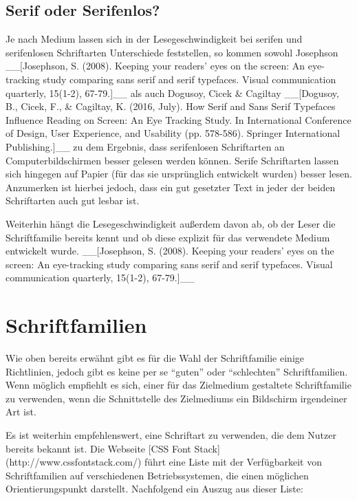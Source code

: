 \subsection{Serif oder Serifenlos?}
Je nach Medium lassen sich in der Lesegeschwindigkeit bei serifen und serifenlosen Schriftarten Unterschiede feststellen, so kommen sowohl Josephson __[Josephson, S. (2008). Keeping your readers' eyes on the screen: An eye-tracking study comparing sans serif and serif typefaces.
Visual communication quarterly, 15(1-2), 67-79.]__ als auch Dogusoy, Cicek & Cagiltay __[Dogusoy, B., Cicek, F., & Cagiltay, K. (2016, July). How Serif and Sans Serif Typefaces Influence Reading on Screen: An Eye Tracking Study. In International Conference of Design, User Experience, and Usability (pp. 578-586).
Springer International Publishing.]__ zu dem Ergebnis, dass serifenlosen Schriftarten an Computerbildschirmen besser gelesen werden können. Serife Schriftarten lassen sich hingegen auf Papier (für das sie ursprünglich entwickelt wurden) besser lesen.
Anzumerken ist hierbei jedoch, dass ein gut gesetzter Text in jeder der beiden Schriftarten auch gut lesbar ist.

Weiterhin hängt die Lesegeschwindigkeit außerdem davon ab, ob der Leser die Schriftfamilie bereits kennt und ob diese explizit für das verwendete Medium entwickelt wurde. __[Josephson, S. (2008). Keeping your readers' eyes on the screen: An eye-tracking study comparing sans serif and serif typefaces.
Visual communication quarterly, 15(1-2), 67-79.]__



\section{Schriftfamilien}
Wie oben bereits erwähnt gibt es für die Wahl der Schriftfamilie einige Richtlinien, jedoch gibt es keine per se “guten” oder “schlechten” Schriftfamilien.
Wenn möglich empfiehlt es sich, einer für das Zielmedium gestaltete Schriftfamilie zu verwenden, wenn die Schnittstelle des Zielmediums ein Bildschirm irgendeiner Art ist.

Es ist weiterhin empfehlenswert, eine Schriftart zu verwenden, die dem Nutzer bereits bekannt ist. Die Webseite [CSS Font Stack](http://www.cssfontstack.com/) führt eine Liste mit der Verfügbarkeit von Schriftfamilien auf verschiedenen Betriebssystemen, die einen möglichen Orientierungspunkt darstellt. Nachfolgend ein Auszug aus dieser Liste:

